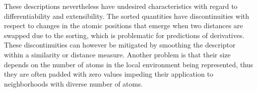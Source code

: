 These descriptions nevertheless have undesired characteristics with regard to differentiability and extensibility.
The sorted quantities have discontinuities with respect to changes in the atomic positions that emerge when two distances are swapped due to the sorting, which is problematic for predictions of derivatives.
These discontinuities can however be mitigated by smoothing the descriptor within a similarity or distance measure.
Another problem is that their size depends on the number of atoms in the local environment being represented, thus they are often padded with zero values impeding their application to neighborhoods with diverse number of atoms.


%

